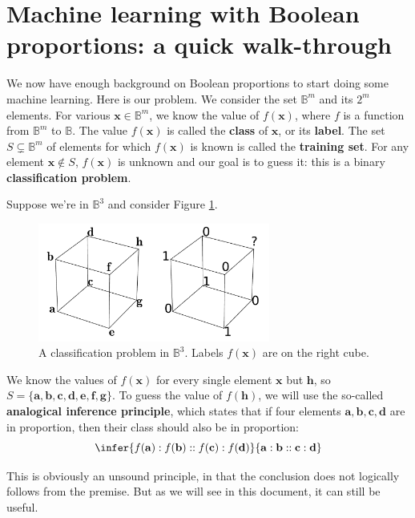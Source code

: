 \section{Machine learning with Boolean proportions: a quick walk-through}
\label{SEC:machine_learning_with_boolean_proportions}

We now have enough background on Boolean proportions to start doing some machine
learning. Here is our problem. We consider the set $\mathbb{B}^m$ and its $2^m$
elements. For various $\mathbf{x} \in \mathbb{B}^m$, we know the value of
$f(\mathbf{x})$, where $f$ is a function from $\mathbb{B}^m$ to $\mathbb{B}$.
The value $f(\mathbf{x})$ is called the \textbf{class} of $\mathbf{x}$, or its
\textbf{label}. The set $S \subsetneq \mathbb{B}^m$ of elements for which
$f(\mathbf{x})$ is known is called the \textbf{training set}. For any element
$\mathbf{x} \notin S$, $f(\mathbf{x})$ is unknown and our goal is to guess it:
this is a binary \textbf{classification problem}.

Suppose we're in $\mathbb{B}^3$ and consider Figure
\ref{FIG:classification_problem}.
\begin{figure}[!h]
\centering
  \includegraphics[width=3in]{figures/classification_problem.pdf}
  \caption{A classification problem in $\mathbb{B}^3$. Labels $f(\mathbf{x})$
  are on the right cube.}
\label{FIG:classification_problem}
\end{figure}
We know the values of $f(\mathbf{x})$ for
every single element $\mathbf{x}$ but $\mathbf{h}$, so $S = \{ \mathbf{a}, \mathbf{b},
\mathbf{c}, \mathbf{d}, \mathbf{e}, \mathbf{f}, \mathbf{g}\}$. To guess the
value of $f(\mathbf{h})$, we will use the so-called \textbf{analogical
inference principle}, which states that if four elements $\mathbf{a},
\mathbf{b}, \mathbf{c}, \mathbf{d}$ are in proportion, then their class should
also be in proportion:
$$
\infer{f(\mathbf{a}) : f(\mathbf{b}) :: f(\mathbf{c})
: f(\mathbf{d})}{\mathbf{a} : \mathbf{b} :: \mathbf{c} : \mathbf{d}}
$$

This is obviously an unsound principle, in that the conclusion does not
logically follows from the premise. But as we will see in this document, it can
still be useful.

